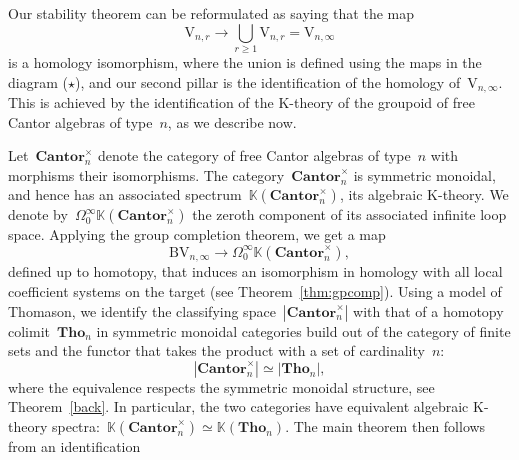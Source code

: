 \documentclass[10pt]{article}
\newcommand{\Can}{\mathbf{Cantor}}
\newcommand{\Tho}{\mathbf{Tho}}
\newcommand{\bbK}{\mathbb{K}}
\newcommand{\rmB}{\mathrm{B}}
\newcommand{\rmH}{\mathrm{H}}
\newcommand{\rmV}{\mathrm{V}}
\newcommand{\x}{\times}
\theoremstyle{definition}
\numberwithin{theorem}{section}
\numberwithin{equation}{section}
\numberwithin{figure}{section}
\begin{document}

Our stability theorem can be reformulated as 
saying that the map
\[
\rmV_{n,r}\longrightarrow\bigcup_{r\geqslant 1}\rmV_{n,r}=\rmV_{n,\infty}
\]
is a homology isomorphism, where the union is defined using the maps in the diagram ($\star$), and 
our second pillar is the identification of the homology
of~$\rmV_{n,\infty}$. This is achieved by the identification of the
K-theory of the groupoid of free Cantor algebras of type~$n$, as we describe now. 

Let~$\Can_n^\x$ denote the category of free Cantor algebras of
type~$n$ with morphisms their isomorphisms.  The category~$\Can_n^\x$
is symmetric monoidal, and hence has an associated
spectrum~$\bbK(\Can_n^\x)$, its algebraic K-theory. We denote by~$\Omega^\infty_0\bbK(\Can_n^\x)$ the zeroth component of its associated infinite loop space. 
Applying the group completion theorem, we get a map  
\[
\rmB\rmV_{n,\infty}\longrightarrow\Omega^\infty_0\bbK(\Can_n^\x),
\]
defined up to homotopy, that induces an isomorphism in homology with all local coefficient systems on the target 
(see Theorem~\ref{thm:gpcomp}).  
Using a model of Thomason, we identify the classifying space~$|\Can_n^\x|$ with that of a homotopy colimit~$\Tho_n$ in symmetric monoidal categories %
build out of the category of finite sets and the functor that takes the product with a set of cardinality~$n$:
\[
|\Can_n^\x|\simeq |\Tho_n|,
\]
where the equivalence respects the symmetric monoidal structure, see Theorem~\ref{back}. 
In particular, the two categories have equivalent algebraic K-theory spectra:~$\bbK(\Can_n^\x)\simeq \bbK(\Tho_n)$. The main theorem then follows from an identification
\end{document}
